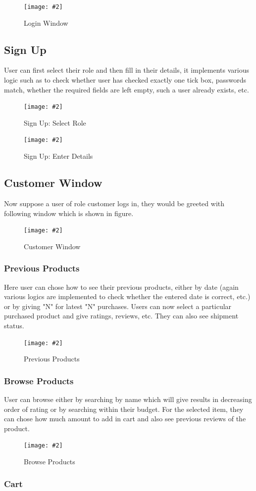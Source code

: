 \documentclass[a4paper,12pt]{article}
\newcommand{\iph}[2]{
    \texttt{[image: \#2]}
}
\newcommand{\dph}[3]{
\begin{figure}[H]
  \centering
  \iph{#1}{#2}
  \caption{#3}
\end{figure}
}
\begin{document}
\dph{0.78}{log}{Login Window}

\subsection{Sign Up}

User can first select their role and then fill in their details, it implements various logic such as to check whether user has checked exactly one tick box, passwords match, whether the required fields are left empty, such a user already exists, etc.

\dph{0.78}{sign}{Sign Up: Select Role}

\dph{0.78}{sign2}{Sign Up: Enter Details}

\subsection{Customer Window}

Now suppose a user of role customer logs in, they would be greeted with following window which is shown in figure.

\dph{0.66}{customer}{Customer Window}


\subsubsection{Previous Products}

Here user can chose how to see their previous products, either by date (again various logics are implemented to check whether the entered date is correct, etc.) or by giving "N" for latest "N" purchases. Users can now select a particular purchased product and give ratings, reviews, etc. They can also see shipment status.

\dph{0.99}{previousprod}{Previous Products}

\subsubsection{Browse Products}

User can browse either by searching by name which will give results in decreasing order of rating or by searching within their budget. For the selected item, they can chose how much amount to add in cart and also see previous reviews of the product.

\dph{0.99}{browseprod}{Browse Products}

\subsubsection{Cart}
\end{document}
